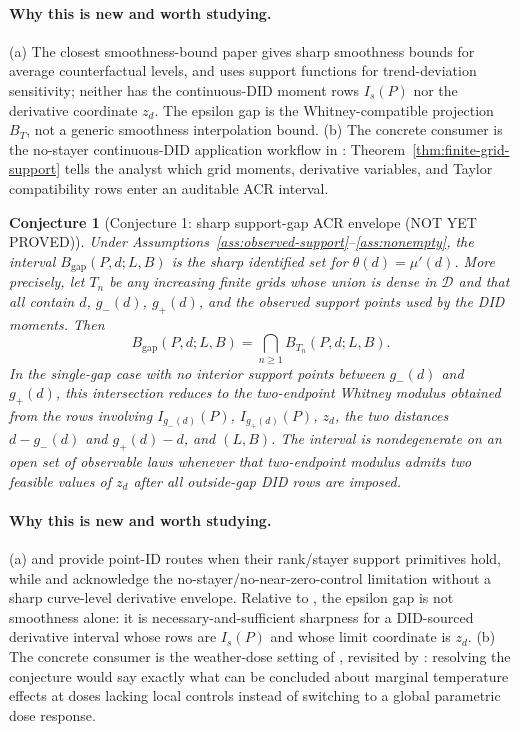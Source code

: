 \documentclass[11pt]{article}
\theoremstyle{definition}
\theoremstyle{plain}
\newtheorem{conjecture}{Conjecture}
\theoremstyle{remark}
\begin{document}
\paragraph{Why this is new and worth studying.}
(a) The closest smoothness-bound paper \citet{KimKwonKwonLee2018} gives sharp smoothness bounds for average counterfactual levels, and \citet{RambachanRoth2023} uses support functions for trend-deviation sensitivity; neither has the continuous-DID moment rows \(I_s(P)\) nor the derivative coordinate \(z_d\).  The epsilon gap is the Whitney-compatible projection \(B_T\), not a generic smoothness interpolation bound.  (b) The concrete consumer is the no-stayer continuous-DID application workflow in \citet{deChaisemartinDHaultfoeuilleVazquezBare2024}: Theorem~\ref{thm:finite-grid-support} tells the analyst which grid moments, derivative variables, and Taylor compatibility rows enter an auditable ACR interval.

\begin{conjecture}[Conjecture 1: sharp support-gap ACR envelope (NOT YET PROVED)]\label{conj:sharp-gap-envelope}
Under Assumptions~\ref{ass:observed-support}--\ref{ass:nonempty}, the interval \(B_{\mathrm{gap}}(P,d;L,B)\) is the sharp identified set for \(\theta(d)=\mu'(d)\).  More precisely, let \(T_n\) be any increasing finite grids whose union is dense in \(\mathcal D\) and that all contain \(d\), \(g_-(d)\), \(g_+(d)\), and the observed support points used by the DID moments.  Then
\[
  B_{\mathrm{gap}}(P,d;L,B)=
  \bigcap_{n\ge 1} B_{T_n}(P,d;L,B).
\]
In the single-gap case with no interior support points between \(g_-(d)\) and \(g_+(d)\), this intersection reduces to the two-endpoint Whitney modulus obtained from the rows involving \(I_{g_-(d)}(P)\), \(I_{g_+(d)}(P)\), \(z_d\), the two distances \(d-g_-(d)\) and \(g_+(d)-d\), and \((L,B)\).  The interval is nondegenerate on an open set of observable laws whenever that two-endpoint modulus admits two feasible values of \(z_d\) after all outside-gap DID rows are imposed.
\end{conjecture}
\paragraph{Why this is new and worth studying.}
(a) \citet{DHaultfoeuilleHoderleinSasaki2023} and \citet{deChaisemartinDHaultfoeuillePasquierSowVazquezBare2022} provide point-ID routes when their rank/stayer support primitives hold, while \citet{deChaisemartinDHaultfoeuilleVazquezBare2024} and \citet{deChaisemartinCicciaDHaultfoeuilleKnau2024} acknowledge the no-stayer/no-near-zero-control limitation without a sharp curve-level derivative envelope.  Relative to \citet{KimKwonKwonLee2018}, the epsilon gap is not smoothness alone: it is necessary-and-sufficient sharpness for a DID-sourced derivative interval whose rows are \(I_s(P)\) and whose limit coordinate is \(z_d\).  (b) The concrete consumer is the weather-dose setting of \citet{DeschenesGreenstone2012}, revisited by \citet{deChaisemartinDHaultfoeuilleVazquezBare2024}: resolving the conjecture would say exactly what can be concluded about marginal temperature effects at doses lacking local controls instead of switching to a global parametric dose response.
\end{document}
